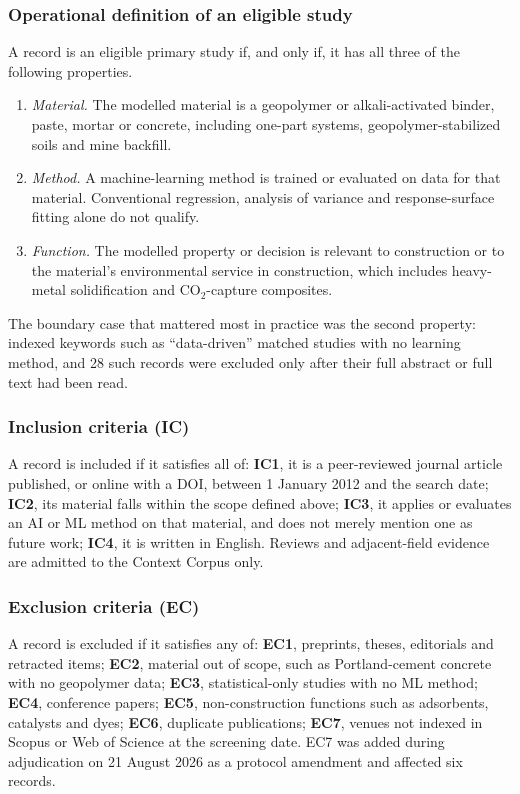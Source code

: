 \documentclass[pdflatex,sn-basic]{sn-jnl}
\begin{document}
\subsubsection{Operational definition of an eligible study}

A record is an eligible primary study if, and only if, it has all three of the following properties.
\begin{enumerate}
\item \emph{Material.} The modelled material is a geopolymer or alkali-activated binder, paste, mortar or concrete, including one-part systems, geopolymer-stabilized soils and mine backfill.
\item \emph{Method.} A machine-learning method is trained or evaluated on data for that material. Conventional regression, analysis of variance and response-surface fitting alone do not qualify.
\item \emph{Function.} The modelled property or decision is relevant to construction or to the material's environmental service in construction, which includes heavy-metal solidification and CO$_2$-capture composites.
\end{enumerate}
The boundary case that mattered most in practice was the second property: indexed keywords such as ``data-driven'' matched studies with no learning method, and 28 such records were excluded only after their full abstract or full text had been read.

\subsubsection{Inclusion criteria (IC)}

A record is included if it satisfies all of: \textbf{IC1}, it is a peer-reviewed journal article published, or online with a DOI, between 1 January 2012 and the search date; \textbf{IC2}, its material falls within the scope defined above; \textbf{IC3}, it applies or evaluates an AI or ML method on that material, and does not merely mention one as future work; \textbf{IC4}, it is written in English. Reviews and adjacent-field evidence are admitted to the Context Corpus only.

\subsubsection{Exclusion criteria (EC)}

A record is excluded if it satisfies any of: \textbf{EC1}, preprints, theses, editorials and retracted items; \textbf{EC2}, material out of scope, such as Portland-cement concrete with no geopolymer data; \textbf{EC3}, statistical-only studies with no ML method; \textbf{EC4}, conference papers; \textbf{EC5}, non-construction functions such as adsorbents, catalysts and dyes; \textbf{EC6}, duplicate publications; \textbf{EC7}, venues not indexed in Scopus or Web of Science at the screening date. EC7 was added during adjudication on 21 August 2026 as a protocol amendment and affected six records.
\end{document}
